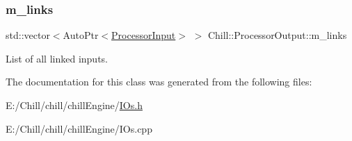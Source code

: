 \subsubsection{\texorpdfstring{m\+\_\+links}{m\_links}}
{\footnotesize\ttfamily std\+::vector$<$Auto\+Ptr$<$\mbox{\hyperlink{class_chill_1_1_processor_input}{Processor\+Input}}$>$ $>$ Chill\+::\+Processor\+Output\+::m\+\_\+links}

List of all linked inputs. 

The documentation for this class was generated from the following files\+:\begin{DoxyCompactItemize}
\item 
E\+:/\+Chill/chill/chill\+Engine/\mbox{\hyperlink{_i_os_8h}{I\+Os.\+h}}\item 
E\+:/\+Chill/chill/chill\+Engine/I\+Os.\+cpp\end{DoxyCompactItemize}
